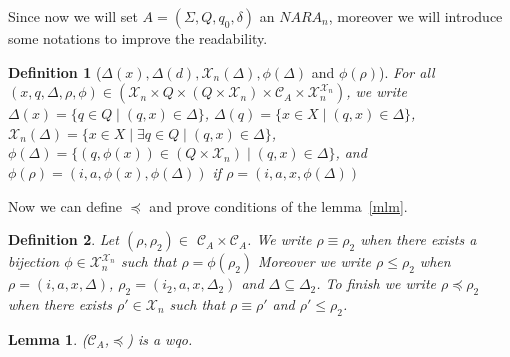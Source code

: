 \documentclass[a4paper,10pt]{report}
\newtheorem{lm}{Lemma}[thr]
\newtheorem{df}{Definition}
\newcommand{\C}{\mathcal{C}_{A}}
\newcommand{\X}{\mathcal{X}_{n}}
\begin{document}
Since now we will set $A =(\Sigma ,Q ,q_0, \delta )$ an $NARA_n$, moreover we will introduce some notations to improve the readability.

\begin{df}[$\Delta(x), \Delta(d),\X(\Delta), \phi(\Delta)$ and $ \phi(\rho)$]
For all $(x,q,\Delta,\rho,\phi) \in (\X \times Q \times (Q \times \X) \times \C \times \X^{\X})$, we write 
$\Delta(x) = \{ q\in Q \mid (q,x) \in \Delta \}$,
$\Delta(q) = \{ x\in X \mid (q,x) \in \Delta \}$,
$\X(\Delta) = \{ x\in X \mid \exists q\in Q \mid (q,x) \in \Delta \}$,
$\phi(\Delta) = \{ (q,\phi(x)) \in (Q \times \X) \mid (q,x) \in \Delta \}$,
and $\phi(\rho) = (i,a,\phi(x),\phi(\Delta))$ if $\rho = (i,a,x,\phi(\Delta))$
\end{df}

Now we can define $\preceq$ and prove conditions of the lemma~\ref{mlm}.

\begin{df}
  Let $(\rho,\rho_2) \in$  $\C\times\C$.
  We write $\rho \equiv \rho_2$ when there exists a bijection $\phi \in \X^{\X}$ such that $\rho = \phi(\rho_2)$  
  Moreover we write $\rho \leq \rho_2$ when $ \rho=( i,a ,x, \Delta  )$, $\rho_2=( i_2,a ,x, \Delta_2  )$ and $\Delta \subseteq \Delta_2$.
  To finish we write $\rho \preceq \rho_2$ when there exists $\rho' \in \X$ such that $\rho \equiv \rho'$ and $\rho' \leq \rho_2$.
\end{df}


\begin{lm} \label{cd1}
  ($\C$,$\preceq$) is a wqo.
\end{lm}
\end{document}
